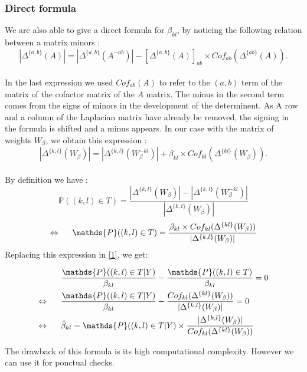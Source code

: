 \documentclass[a4paper,10pt]{article}
\begin{document}
 \subsubsection{Direct formula}
 We are also able to give a direct formula for $\beta_{kl}$, by noticing the following relation between a matrix minors :
 \[|\Delta^{\{a,b\}}(A)|=|\Delta^{\{a,b\}}(A^{- ab})| - [\Delta^{\{a,b\}}(A)]_{ab}\times Cof_{ab}(\Delta^{\{ab\}}(A)).\]\\
 In the last expression we used $Cof_{ab}(A)$ to refer to the $(a,b)$ term of the matrix of the cofactor matrix of the $A$ matrix. The minus in 
 the second term comes from the signs of minors in the development of the determinent. As A row and a column of the Laplacian matrix have
 already be removed, the signing in the formula is shifted and a minus appears. In our case with the matrix of weights $W_\beta$, we obtain this expression :
\[|\Delta^{\{k,l\}}(W_\beta)|=|\Delta^{\{k,l\}}(W_\beta^{- kl})| + \beta_{kl}\times Cof_{kl}(\Delta^{\{kl\}}(W_\beta)).\]\\

By definition we have :
\[\mathds{P}((k,l)\in T ) = \frac{|\Delta^{\{k,l\}}(W_\beta)|-|\Delta^{\{k,l\}}(W_\beta^{- kl})|}{|\Delta^{\{k,l\}}(W_\beta)|}\]
\[\Leftrightarrow  \text{\hspace{0.5cm}}\mathds{P}((k,l)\in T ) =\frac{\beta_{kl}\times Cof_{kl}(\Delta^{\{kl\}}(W_\beta))}{|\Delta^{\{k,l\}}(W_\beta)|}\]
Replacing this expression in \ref{1}, we get:

\begin{align*}
 &\frac{ \mathds{P}((k,l)\in T | Y)}{\beta_{kl}} -\frac{\mathds{P}((k,l)\in T)}{\beta_{kl}} =0 \\
 \Leftrightarrow \text{\hspace{0.5cm}}& \frac{ \mathds{P}((k,l)\in T | Y)}{\beta_{kl}} -\frac{Cof_{kl}(\Delta^{\{kl\}}(W_\beta))}{|\Delta^{\{k,l\}}(W_\beta)|}=0\\
 \Leftrightarrow \text{\hspace{0.5cm}}& \hat{\beta}_{kl} = \mathds{P}((k,l)\in T | Y) \times \frac{|\Delta^{\{k,l\}}(W_\beta)|}{Cof_{kl}(\Delta^{\{kl\}}(W_\beta))}
\end{align*}

The drawback of this formula is its high computational complexity. However we can use it for ponctual checks.
\end{document}
